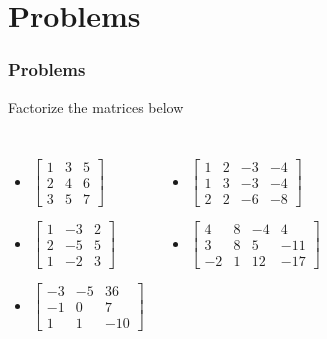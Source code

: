 \section{Problems}
\begin{frame}
    \frametitle{Problems}

    \begin{exampleblock}{Factorize the matrices below}
    \begin{columns}[t]
    \begin{itemize}[<+|alert@+>]
        \item
            \(
            \left[
            \begin{array}{rrr}
                1&3&5\\
                2&4&6\\
                3&5&7
            \end{array}
            \right]
            \)
        \item
            \(
            \left[
            \begin{array}{rrr}
                1&-3&2\\
                2&-5&5\\
                1&-2&3
            \end{array}
            \right]
            \)
        \item
            \(
            \left[
            \begin{array}{rrr}
                -3&-5&36\\
                -1&0&7\\
                1&1&-10
            \end{array}
            \right]
            \)
    \end{itemize}
    \begin{itemize}[<+|alert@+>]
        \item
            \(
            \left[
            \begin{array}{rrrr}
                1&2&-3&-4\\
                1&3&-3&-4\\
                2&2&-6&-8
            \end{array}
            \right]
            \)
        \item
            \(
            \left[
            \begin{array}{rrrr}
                4&8&-4&4\\
                3&8&5&-11\\
                -2&1&12&-17
            \end{array}
            \right]
            \)
    \end{itemize}
    \end{columns}
    \end{exampleblock}
\end{frame}


